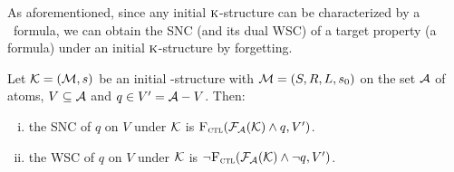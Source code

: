 \documentclass{article}
\begin{document}
As aforementioned, since any initial $\textsc{k}$-structure can be characterized by a \CTL\ formula, we can obtain the SNC (and its dual WSC) of a target property (a formula) under an initial $\textsc{k}$-structure by forgetting.
\begin{theorem}\label{thm:inK:SNC}
Let ${\cal K}= ({\cal M}, s)$ be an initial \MPK-structure with ${\cal M}=(S,R,L,s_0)$ on the set ${\cal A}$ of atoms, $V \subseteq {\cal A}$ and $q\in V' = {\cal A} - V$. Then:
 \begin{enumerate}[(i)]
   \item the SNC of $q$ on $V$ under ${\cal K}$ is ${\textsc{F}_{\textsc{ctl}}}({\cal F}_{{\cal A}}({\cal K}) \wedge q, V')$.
   \item the WSC of $q$ on $V$ under ${\cal K}$ is $\neg {\textsc{F}_{\textsc{ctl}}}({\cal F}_{{\cal A}}({\cal K}) \wedge \neg q, V')$.
 \end{enumerate}
\end{theorem}
%
\end{document}
